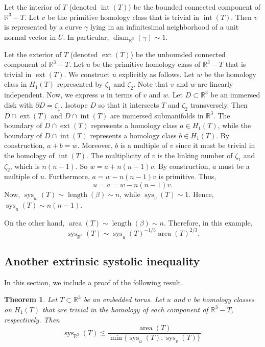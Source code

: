 \documentclass[12pt]{amsart}
\DeclareMathOperator*{\Area}{area}
\DeclareMathOperator*{\diam}{diam}
\DeclareMathOperator*{\length}{length}
\DeclareMathOperator*{\sys}{sys}
\DeclareMathOperator*{\interior}{int}
\DeclareMathOperator*{\exterior}{ext}
\newtheorem{theorem}{Theorem}[section]
\theoremstyle{definition}
\begin{document}
Let the interior of $T$ (denoted $\interior(T)$) be the bounded connected component of $\mathbb{R}^3-T$. Let $v$ be the primitive homology class that is trivial in $\interior(T)$. Then $v$ is represented by a curve $\gamma$ lying in an infinitesimal neighborhood of a unit normal vector in $U$. In particular, $\diam_{\mathbb{R}^3}(\gamma)\sim 1$.

Let the exterior of $T$ (denoted $\exterior(T)$) be the unbounded connected component of $\mathbb{R}^3-T$. Let $u$ be the primitive homology class of $\mathbb{R}^3-T$ that is trivial in $\exterior(T)$. We construct $u$ explicitly as follows. Let $w$ be the homology class in $H_1(T)$ represented by $\zeta_1$ and $\zeta_2$. Note that $v$ and $w$ are linearly independent. Now, we express $u$ in terms of $v$ and $w$. Let $D\subset \mathbb{R}^3$ be an immersed disk with $\partial D=\zeta_1$. Isotope $D$ so that it intersects $T$ and $\zeta_2$ transversely. Then $D\cap \exterior(T)$ and $D\cap \interior(T)$ are immersed submanifolds in $\mathbb{R}^3$. The boundary of $D\cap \exterior(T)$ represents a homology class $a\in H_1(T)$, while the boundary of $D\cap \interior(T)$ represents a homology class $b\in H_1(T)$. By construction, $a+b=w$. Moreover, $b$ is a multiple of $v$ since it must be trivial in the homology of $\interior(T)$. The multiplicity of $v$ is the linking number of $\zeta_1$ and $\zeta_2$, which is $n(n-1)$. So $w=a+n(n-1)v$. By construction, $a$ must be a multiple of $u$. Furthermore, $a=w-n(n-1)v$ is primitive. Thus, $$u=a=w-n(n-1)v.$$ Now, $\sys_w(T)\sim \length(\beta)\sim n$, while $\sys_v(T)\sim 1$. Hence, $\sys_u(T)\sim n(n-1)$.

On the other hand, $\Area(T)\sim \length(\beta)\sim n$. Therefore, in this example, $$\textstyle\sys_{\mathbb{R}^3}(T)\sim \sys_u(T)^{-1/3}\Area(T)^{2/3}.$$

\subsection{Another extrinsic systolic inequality} \label{Appendix A2} In this section, we include a proof of the following result. 

\begin{theorem}\label{Pardon embedding theorem} Let $T\subset \mathbb{R}^3$ be an embedded torus. Let $u$ and $v$ be homology classes on $H_1(T)$ that are trivial in the homology of each component of $\mathbb{R}^3-T$, respectively. Then $$\textstyle\sys_{\mathbb{R}^3}(T)\lesssim \displaystyle\frac{\Area(T)}{\min\{\sys_u(T),\sys_v(T)\}}.$$
\end{theorem}
\end{document}
